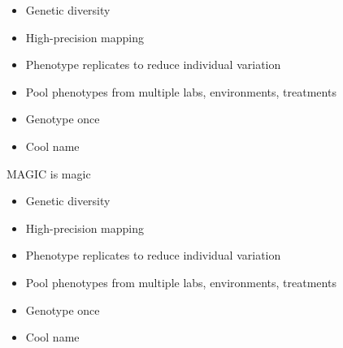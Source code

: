 \documentclass[12pt]{article}
\newcommand{\headsize}{\fontsize{35}{35} \selectfont}
\newcommand{\smallsize}{\fontsize{25}{30} \selectfont}
\begin{document}
{\vspace{25mm}

\color{mywhite}
\smallsize

\hfill \begin{minipage}{10in}
\begin{itemize}
\itemsep24pt
\item Genetic diversity

\item High-precision mapping

\item Phenotype replicates to reduce individual variation

\item Pool phenotypes from multiple labs, environments, treatments

\item Genotype once

\color{mybgcolor}
\item Cool name

\end{itemize}
\end{minipage}



\newpage

\addtocounter{page}{-1}

\headsize \color{myyellow}
\hfill \begin{minipage}{5.75in}
\centering
MAGIC is magic
\end{minipage}

\vspace{25mm}

\color{mywhite}
\smallsize

\hfill \begin{minipage}{10in}
\begin{itemize}
\itemsep24pt
\item Genetic diversity

\item High-precision mapping

\item Phenotype replicates to reduce individual variation

\item Pool phenotypes from multiple labs, environments, treatments

\item Genotype once

\color{myblue}
\item Cool name


\end{itemize}
\end{minipage}}
\end{document}
